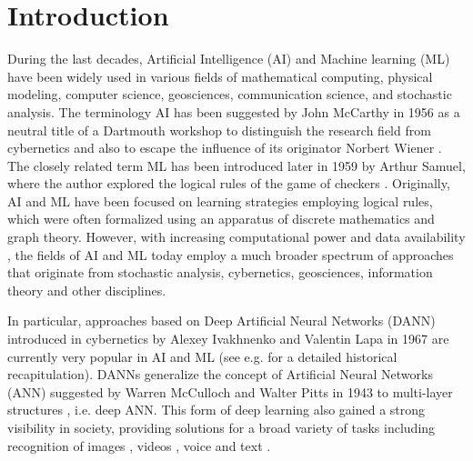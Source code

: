 \documentclass[a4paper,fleqn]{article}
\newcommand{\rw}[1]{\textcolor{blue}{#1}}
\renewcommand{\rw}[1]{#1}
\begin{document}




\section{Introduction}
\label{intro}

During the last decades, Artificial Intelligence (AI) and Machine learning (ML) have been widely used in various fields of mathematical computing, physical modeling, computer science, geosciences, communication science, and stochastic analysis. The terminology AI has been suggested by John McCarthy in 1956 as a neutral title of a Dartmouth workshop \cite{mccarthy1988review} to distinguish the research field from cybernetics and also to escape the influence of its originator Norbert Wiener \cite{wiener1948cybernetics}. The closely related term ML has been introduced later in 1959 by Arthur Samuel, where the author explored the logical rules of the game of checkers \cite{samuel1959some}.  Originally, AI and ML have been focused on learning strategies employing logical rules, which were often formalized using an apparatus of discrete mathematics and graph theory. However, with increasing computational power \cite{miikkulainen2019evolving} and data availability \cite{najafabadi2015deep}, the fields of AI and ML today employ a much broader spectrum of approaches that originate from stochastic analysis, cybernetics, geosciences, information theory and other disciplines.  

In particular, approaches based on Deep Artificial Neural Networks (DANN) introduced in cybernetics by Alexey Ivakhnenko and Valentin Lapa in 1967 \cite{ivakhnenko1967cybernetics} are currently very popular in AI and ML \rw{(see e.g. \cite{schmidhuber2022annotated} for a detailed historical recapitulation)}. DANNs generalize the concept of Artificial Neural Networks (ANN) suggested by Warren McCulloch and Walter Pitts in 1943 \cite{mcculloch1943logical} to multi-layer structures \rw{, i.e. deep ANN}. This form of deep learning also gained a strong visibility in society, providing solutions for \rw{a} broad variety of tasks including recognition of images \cite{tian2020image}, videos \cite{ciaparrone2020deep},  voice \cite{arik2017deep} and text \cite{shi2016end}. 
\end{document}
